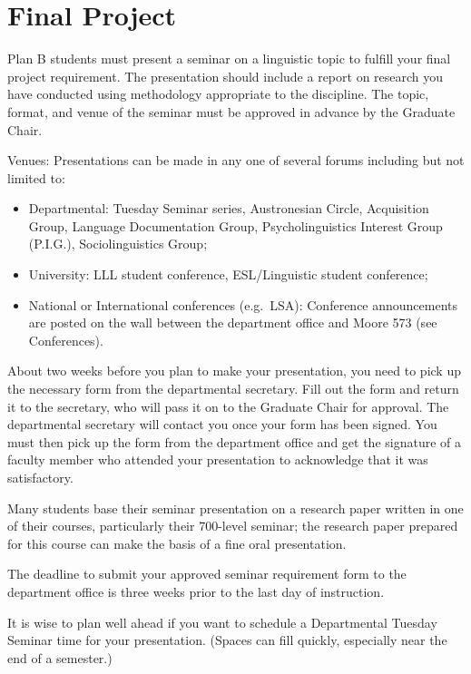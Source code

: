 \documentclass[
]{book}
\providecommand{\tightlist}{%
  \setlength{\itemsep}{0pt}\setlength{\parskip}{0pt}}
\begin{document}
\hypertarget{final-project}{%
\section{Final Project}\label{final-project}}

Plan B students must present a seminar on a linguistic topic to fulfill your final project requirement. The presentation should include a report on research you have conducted using methodology appropriate to the discipline. The topic, format, and venue of the seminar must be approved in advance by the Graduate Chair.

Venues: Presentations can be made in any one of several forums including but not limited to:

\begin{itemize}
\tightlist
\item
  Departmental: Tuesday Seminar series, Austronesian Circle, Acquisition Group, Language Documentation Group, Psycholinguistics Interest Group (P.I.G.), Sociolinguistics Group;
\item
  University: LLL student conference, ESL/Linguistic student conference;
\item
  National or International conferences (e.g.~LSA): Conference announcements are posted on the wall between the department office and Moore 573 (see Conferences).
\end{itemize}

About two weeks before you plan to make your presentation, you need to pick up the necessary form from the departmental secretary. Fill out the form and return it to the secretary, who will pass it on to the Graduate Chair for approval. The departmental secretary will contact you once your form has been signed. You must then pick up the form from the department office and get the signature of a faculty member who attended your presentation to acknowledge that it was satisfactory.

Many students base their seminar presentation on a research paper written in one of their courses, particularly their 700-level seminar; the research paper prepared for this course can make the basis of a fine oral presentation.

The deadline to submit your approved seminar requirement form to the department office is three weeks prior to the last day of instruction.

It is wise to plan well ahead if you want to schedule a Departmental Tuesday Seminar time for your presentation. (Spaces can fill quickly, especially near the end of a semester.)
\end{document}
